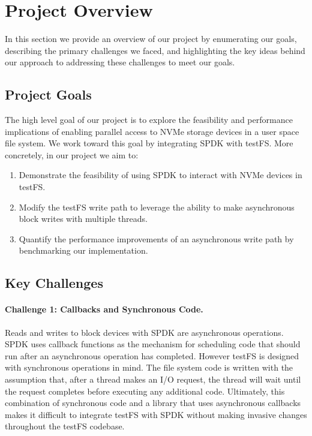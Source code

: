 \section{Project Overview}
In this section we provide an overview of our project by enumerating our goals,
describing the primary challenges we faced, and highlighting the key ideas
behind our approach to addressing these challenges to meet our goals.

\subsection{Project Goals}
The high level goal of our project is to explore the feasibility and
performance implications of enabling parallel access to NVMe storage devices in
a user space file system. We work toward this goal by integrating SPDK with
testFS. More concretely, in our project we aim to:

\begin{enumerate}
  \item Demonstrate the feasibility of using SPDK to interact with NVMe devices
    in testFS.
  \item Modify the testFS write path to leverage the ability to make
    asynchronous block writes with multiple threads.
  \item Quantify the performance improvements of an asynchronous write path by
    benchmarking our implementation.
\end{enumerate}

\subsection{Key Challenges}

\paragraph{Challenge 1: Callbacks and Synchronous Code.}
Reads and writes to block devices with SPDK are asynchronous operations. SPDK
uses callback functions as the mechanism for scheduling code that should run
after an asynchronous operation has completed. However testFS is designed with
synchronous operations in mind. The file system code is written with the
assumption that, after a thread makes an I/O request, the thread will wait
until the request completes before executing any additional code. Ultimately,
this combination of synchronous code and a library that uses asynchronous
callbacks makes it difficult to integrate testFS with SPDK without making
invasive changes throughout the testFS codebase.

